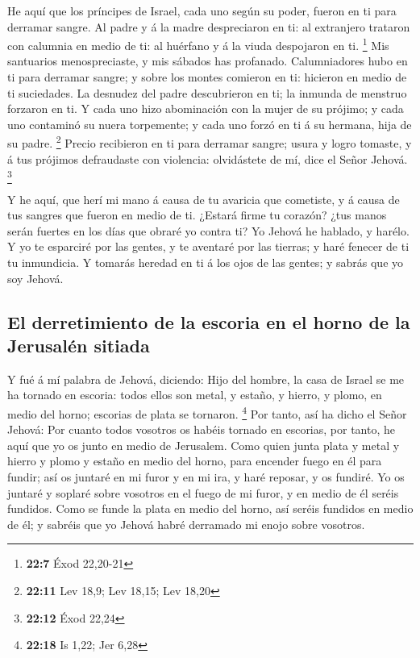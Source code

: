  He aquí que los príncipes de Israel, cada uno según su
poder, fueron en ti para derramar sangre.  Al padre y á la
madre despreciaron en ti: al extranjero trataron con calumnia en medio
de ti: al huérfano y á la viuda despojaron en ti. \footnote{\textbf{22:7}
  Éxod 22,20-21}  Mis santuarios menospreciaste, y mis
sábados has profanado.  Calumniadores hubo en ti para
derramar sangre; y sobre los montes comieron en ti: hicieron en medio de
ti suciedades.  La desnudez del padre descubrieron en ti;
la inmunda de menstruo forzaron en ti.  Y cada uno hizo
abominación con la mujer de su prójimo; y cada uno contaminó su nuera
torpemente; y cada uno forzó en ti á su hermana, hija de su padre.
\footnote{\textbf{22:11} Lev 18,9; Lev 18,15; Lev 18,20} 
Precio recibieron en ti para derramar sangre; usura y logro tomaste, y á
tus prójimos defraudaste con violencia: olvidástete de mí, dice el Señor
Jehová. \footnote{\textbf{22:12} Éxod 22,24}

 Y he aquí, que herí mi mano á causa de tu avaricia que
cometiste, y á causa de tus sangres que fueron en medio de ti.
 ¿Estará firme tu corazón? ¿tus manos serán fuertes en los
días que obraré yo contra ti? Yo Jehová he hablado, y harélo.
 Y yo te esparciré por las gentes, y te aventaré por las
tierras; y haré fenecer de ti tu inmundicia.  Y tomarás
heredad en ti á los ojos de las gentes; y sabrás que yo soy Jehová.

\hypertarget{el-derretimiento-de-la-escoria-en-el-horno-de-la-jerusaluxe9n-sitiada}{%
\subsection{El derretimiento de la escoria en el horno de la Jerusalén
sitiada}\label{el-derretimiento-de-la-escoria-en-el-horno-de-la-jerusaluxe9n-sitiada}}

 Y fué á mí palabra de Jehová, diciendo:  Hijo
del hombre, la casa de Israel se me ha tornado en escoria: todos ellos
son metal, y estaño, y hierro, y plomo, en medio del horno; escorias de
plata se tornaron. \footnote{\textbf{22:18} Is 1,22; Jer 6,28}
 Por tanto, así ha dicho el Señor Jehová: Por cuanto todos
vosotros os habéis tornado en escorias, por tanto, he aquí que yo os
junto en medio de Jerusalem.  Como quien junta plata y
metal y hierro y plomo y estaño en medio del horno, para encender fuego
en él para fundir; así os juntaré en mi furor y en mi ira, y haré
reposar, y os fundiré.  Yo os juntaré y soplaré sobre
vosotros en el fuego de mi furor, y en medio de él seréis fundidos.
 Como se funde la plata en medio del horno, así seréis
fundidos en medio de él; y sabréis que yo Jehová habré derramado mi
enojo sobre vosotros.

